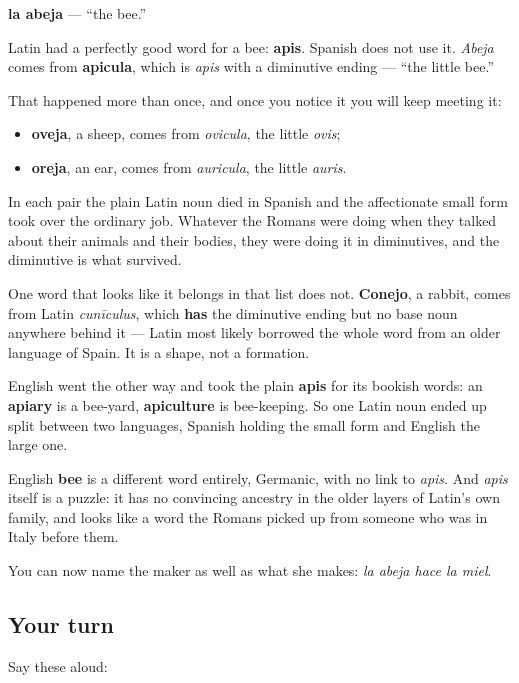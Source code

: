 \begin{cousinweb}
\textbf{la abeja} — \textquotedblleft{}the bee.\textquotedblright{}

Latin had a perfectly good word for a bee: \textbf{apis}. Spanish does not use it. \emph{Abeja} comes from \textbf{apicula}, which is \emph{apis} with a diminutive ending — \textquotedblleft{}the little bee.\textquotedblright{}

That happened more than once, and once you notice it you will keep meeting it:

\begin{itemize}
\raggedright
  \item \textbf{oveja}, a sheep, comes from \emph{ovicula}, the little \emph{ovis};
  \item \textbf{oreja}, an ear, comes from \emph{auricula}, the little \emph{auris}.
\end{itemize}

In each pair the plain Latin noun died in Spanish and the affectionate small form took over the ordinary job. Whatever the Romans were doing when they talked about their animals and their bodies, they were doing it in diminutives, and the diminutive is what survived.

One word that looks like it belongs in that list does not. \textbf{Conejo}, a rabbit, comes from Latin \emph{cunīculus}, which \textbf{has} the diminutive ending but no base noun anywhere behind it — Latin most likely borrowed the whole word from an older language of Spain. It is a shape, not a formation.

English went the other way and took the plain \textbf{apis} for its bookish words: an \textbf{apiary} is a bee-yard, \textbf{apiculture} is bee-keeping. So one Latin noun ended up split between two languages, Spanish holding the small form and English the large one.

English \textbf{bee} is a different word entirely, Germanic, with no link to \emph{apis}. And \emph{apis} itself is a puzzle: it has no convincing ancestry in the older layers of Latin's own family, and looks like a word the Romans picked up from someone who was in Italy before them.
\end{cousinweb}

\begin{grammarlens}[title={What you've built}]
You can now name the maker as well as what she makes: \emph{la abeja hace la miel}.
\end{grammarlens}

\subsection*{Your turn}
Say these aloud:

